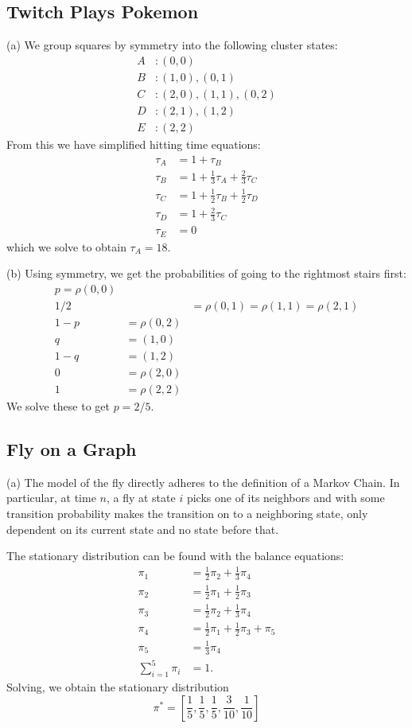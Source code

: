 \subsection{Twitch Plays Pokemon}
(a) We group squares by symmetry into the following cluster states:
\begin{align*}
    A&: (0, 0) \\
    B&: (1, 0), (0, 1) \\
    C&: (2, 0), (1, 1), (0, 2) \\
    D&: (2, 1), (1, 2) \\
    E&: (2, 2)
\end{align*}
From this we have simplified hitting time equations:
\begin{align*}
    \tau_A &= 1 + \tau_B \\
    \tau_B &= 1 + \frac{1}{3}\tau_A + \frac{2}{3}\tau_C \\
    \tau_C &= 1 + \frac{1}{2}\tau_B + \frac{1}{2}\tau_D \\
    \tau_D &= 1 + \frac{2}{3}\tau_C \\
    \tau_E &= 0
\end{align*}
which we solve to obtain $\tau_A = 18$.

(b) Using symmetry, we get the probabilities of going to the rightmost stairs first:
\begin{align*}
    p = \rho(0, 0) \\
    1/2 &&= \rho(0, 1) = \rho(1, 1) = \rho(2, 1) \\
    1 - p &= \rho(0, 2) \\
    q &= (1, 0) \\
    1 - q &= (1, 2) \\
    0 &= \rho(2, 0) \\
    1 &= \rho(2, 2)
\end{align*}
We solve these to get $p = 2/5$.


\subsection{Fly on a Graph}
(a) The model of the fly directly adheres to the definition of a Markov Chain. In particular, at time $n$, a fly at state $i$ picks one of its neighbors and with some transition probability makes the transition on to a neighboring state, only dependent on its current state and no state before that.

The stationary distribution can be found with the balance equations:
\begin{align*}
    \pi_1 &= \frac{1}{2}\pi_2 + \frac{1}{3}\pi_4 \\
    \pi_2 &= \frac{1}{2}\pi_1 + \frac{1}{2}\pi_3 \\
    \pi_3 &= \frac{1}{2}\pi_2 + \frac{1}{3}\pi_4 \\
    \pi_4 &= \frac{1}{2}\pi_1 + \frac{1}{2}\pi_3 + \pi_5 \\
    \pi_5 &= \frac{1}{3}\pi_4 \\
    \sum_{i = 1}^5\pi_i &= 1.
\end{align*}
Solving, we obtain the stationary distribution
\[
\pi^* = \left[\frac{1}{5}, \frac{1}{5}, \frac{1}{5}, \frac{3}{10}, \frac{1}{10}\right]
\]

